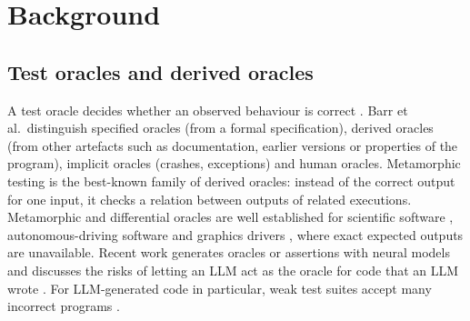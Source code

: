 \section{Background}\label{sec:background}

\subsection{Test oracles and derived oracles}
A test oracle decides whether an observed behaviour is correct \cite{barr2015oracle}. Barr et al.\ distinguish specified oracles (from a formal specification), derived oracles (from other artefacts such as documentation, earlier versions or properties of the program), implicit oracles (crashes, exceptions) and human oracles. Metamorphic testing \cite{chen2018metamorphic,segura2016survey} is the best-known family of derived oracles: instead of the correct output for one input, it checks a relation between outputs of related executions. Metamorphic and differential oracles are well established for scientific software \cite{kanewala2014scientific}, autonomous-driving software \cite{zhou2019driverless} and graphics drivers \cite{donaldson2017shader}, where exact expected outputs are unavailable. Recent work generates oracles or assertions with neural models \cite{dinella2022toga,hossain2023neural} and discusses the risks of letting an LLM act as the oracle for code that an LLM wrote \cite{molina2025oracle}. For LLM-generated code in particular, weak test suites accept many incorrect programs \cite{liu2023evalplus}.

